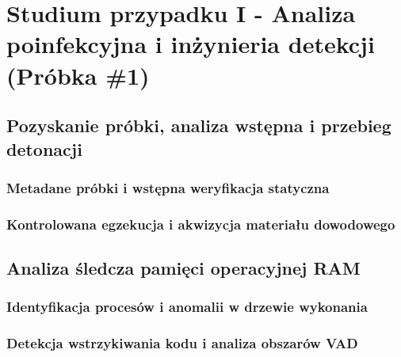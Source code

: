 \chapter{Studium przypadku I - Analiza poinfekcyjna i inżynieria detekcji (Próbka \#1)}\label{ch:studium_przypadku_1}

\section{Pozyskanie próbki, analiza wstępna i przebieg detonacji}\label{sec:cs1_triage}

\subsection{Metadane próbki i wstępna weryfikacja statyczna}\label{subsec:cs1_statyczna}

\subsection{Kontrolowana egzekucja i akwizycja materiału dowodowego}\label{subsec:cs1_egzekucja}

\section{Analiza śledcza pamięci operacyjnej RAM}\label{sec:cs1_analiza_ram}

\subsection{Identyfikacja procesów i anomalii w drzewie wykonania}\label{subsec:cs1_procesy_ram}

\subsection{Detekcja wstrzykiwania kodu i analiza obszarów VAD}\label{subsec:cs1_iniekcja_vad}


